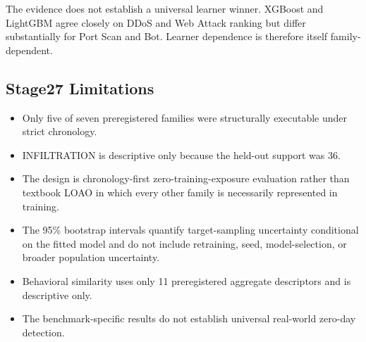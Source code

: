 The evidence does not establish a universal learner winner. XGBoost and LightGBM agree closely on DDoS and Web Attack ranking but differ substantially for Port Scan and Bot. Learner dependence is therefore itself family-dependent.

\subsection{Stage27 Limitations}

\begin{itemize}
\item Only five of seven preregistered families were structurally executable under strict chronology.
\item INFILTRATION is descriptive only because the held-out support was 36.
\item The design is chronology-first zero-training-exposure evaluation rather than textbook LOAO in which every other family is necessarily represented in training.
\item The 95\% bootstrap intervals quantify target-sampling uncertainty conditional on the fitted model and do not include retraining, seed, model-selection, or broader population uncertainty.
\item Behavioral similarity uses only 11 preregistered aggregate descriptors and is descriptive only.
\item The benchmark-specific results do not establish universal real-world zero-day detection.
\end{itemize}

%
